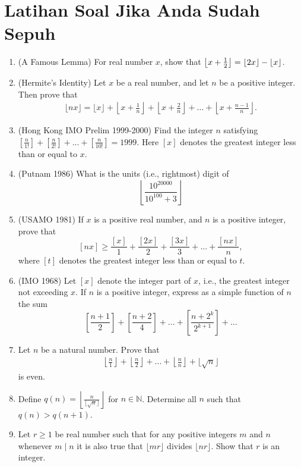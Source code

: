 \documentclass[12pt]{scrartcl}
\begin{document}
\section{Latihan Soal Jika Anda Sudah Sepuh}
\begin{enumerate}
    \item (A Famous Lemma) For real number $x$, show that $\left\lfloor x+\frac{1}{2} \right\rfloor = \left\lfloor 2x \right\rfloor-\left\lfloor x \right\rfloor$.

    \item (Hermite's Identity) Let $x$ be a real number, and let $n$ be a positive integer. Then prove that
    \begin{align*}
         \lfloor nx \rfloor = \lfloor x \rfloor + \left\lfloor x+\frac{1}{n} \right\rfloor + \left\lfloor x+\frac{2}{n} \right\rfloor + \dots + \left\lfloor x+\frac{n-1}{n} \right\rfloor.
    \end{align*}
    

    \item (Hong Kong IMO Prelim 1999-2000) Find the integer $n$ satisfying $\left[\frac{n}{1!}\right]+\left[\frac{n}{2!}\right]+...+\left[\frac{n}{10!}\right]=1999$. Here $[x]$ denotes the greatest integer less than or equal to $x$.

    \item (Putnam 1986) What is the units (i.e., rightmost) digit of
\[\left\lfloor \frac{10^{20000}}{10^{100}+3}\right\rfloor\]

    \item  (USAMO 1981) If $x$ is a positive real number, and $n$ is a positive integer, prove that
\[[nx] \geq \frac{[x]}{1} + \frac{[2x]}{2} + \frac{[3x]}{3} + ... + \frac{[nx]}{n},\]where $[t]$ denotes the greatest integer less than or equal to $t$.

    \item (IMO 1968) Let $[x]$ denote the integer part of $x$, i.e., the greatest integer not exceeding $x$. If $n$ is a positive integer, express as a simple function of $n$ the sum\[\left[\frac{n+1}{2}\right]+\left[\frac{n+2}{4}\right]+...+\left[\frac{n+2^k}{2^{k+1}}\right]+\ldots\]

    \item Let $n$ be a natural number. Prove that
    \begin{align*}
        \left\lfloor \frac{n}{1} \right\rfloor + \left\lfloor \frac{n}{2} \right\rfloor + \dots + \left\lfloor \frac{n}{n} \right\rfloor + \lfloor \sqrt{n} \rfloor
    \end{align*}
    is even.

    \item Define $q(n)=\left\lfloor\frac{n}{\lfloor\sqrt{n}\rfloor}\right\rfloor$ for $n \in \mathbb{N}$. Determine all $n$ such that $q(n)>q(n+1)$.

    \item Let $r \ge 1$ be real number such that for any positive integers $m$ and $n$ whenever $m \mid n$ it is also true that $\lfloor mr \rfloor$ divides $\lfloor nr \rfloor$. Show that $r$ is an integer.
\end{enumerate}
\end{document}
